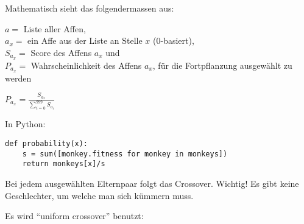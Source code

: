 \documentclass[11pt,a4paper,ngerman]{article}
\begin{document}
\bigskip
Mathematisch sieht das folgendermassen aus:

\bigskip
\begin{addmargin}[2em]{0em}
\begin{center}
$ a = $ Liste aller Affen,\\
$ a_x = $ ein Affe aus der Liste an Stelle $x$ (0-basiert),\\
$ S_{a_x} = $ Score des Affens $ a_x $ und \\
$ P_{a_x} = $ Wahrscheinlichkeit des Affens $ a_x $, für die Fortpflanzung ausgewählt zu werden

\bigskip
\Large$ P_{a_x} = \frac{S_{a_x}}{\sum_{i=0}^{999} S_{a_i}} $\\
\end{center}
\end{addmargin}

\normalsize
In Python:


\begin{addmargin}[2em]{0em}
\begin{lstlisting}
def probability(x):
    s = sum([monkey.fitness for monkey in monkeys])
    return monkeys[x]/s
\end{lstlisting}
\end{addmargin}

Bei jedem ausgewählten Elternpaar folgt das Crossover. Wichtig! Es gibt keine Geschlechter, um welche man sich kümmern muss.

\bigskip
Es wird \enquote{uniform crossover} benutzt:

\bigskip
\begin{addmargin}[2em]{0em}
\begin{center}
\\
\end{center}
\end{addmargin}
\end{document}
